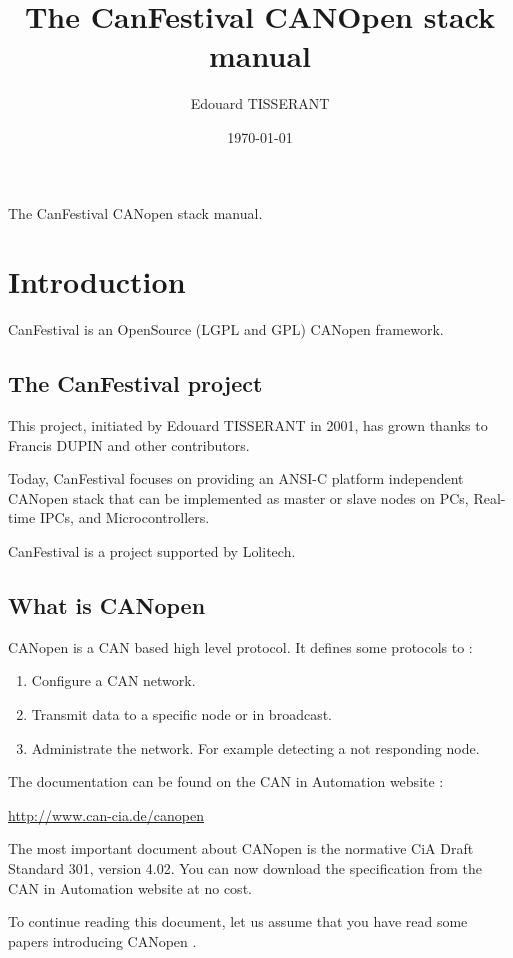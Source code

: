 \documentclass[12pt,english,a4paper]{book}
\title{\Huge The CanFestival CANOpen stack manual}
\author{Edouard TISSERANT}
\date{\today}
\newcommand{\canopen}{CANopen }
\begin{document}
{\centering\textsf{\huge The CanFestival \canopen stack manual.}}

\renewcommand{\contentsname}{CanFestival v3.0 Manual}
\setcounter{tocdepth}{2} \tableofcontents{}

\clearpage{}

\section{Introduction}

CanFestival is an OpenSource (LGPL and GPL) \canopen framework.

\subsection{The CanFestival project}

This project, initiated by Edouard TISSERANT in 2001, has grown thanks
to Francis DUPIN and other contributors.

Today, CanFestival focuses on providing an ANSI-C platform independent
\canopen stack that can be implemented as master or slave nodes on
PCs, Real-time IPCs, and Microcontrollers.

CanFestival is a project supported by Lolitech.


\subsection{What is \canopen}

CANopen is a CAN based high level protocol. It defines some protocols
to :

\begin{enumerate}
\item Configure a CAN network. 
\item Transmit data to a specific node or in broadcast. 
\item Administrate the network. For example detecting a not responding node. 
\end{enumerate}
The documentation can be found on the CAN in Automation website :

\href{http://www.can-cia.de/canopen}{http://www.can-cia.de/canopen}

The most important document about \canopen is the normative CiA Draft
Standard 301, version 4.02. You can now download the specification
from the CAN in Automation website at no cost.

To continue reading this document, let us assume that you have read
some papers introducing \canopen .
\end{document}
